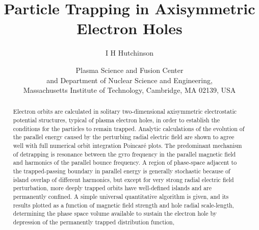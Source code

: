 \documentclass[draft,jgrga]{agutex}
\date{}
\def\maketitle{}
\def\dateskip{}
\def\affil#1{\date{#1}}
\def\dateskip{\medskip}
\begin{document}
\title{Particle Trapping in Axisymmetric Electron Holes}
\author{I H Hutchinson}
\affil{Plasma Science and Fusion Center\\ and
Department of Nuclear Science and Engineering,\\ \dateskip
Massachusetts Institute of Technology, Cambridge, MA 02139, USA}
\maketitle

\begin{abstract}
  Electron orbits are calculated in solitary two-dimensional
  axisymmetric electrostatic potential structures, typical of plasma
  electron holes, in order to establish the conditions for the
  particles to remain trapped.  Analytic calculations of the evolution
  of the parallel energy caused by the perturbing radial electric
  field are shown to agree well with full numerical orbit integration
  Poincar\'e plots. The predominant mechanism of detrapping is
  resonance between the gyro frequency in the parallel magnetic field
  and harmonics of the parallel bounce frequency. A region of
  phase-space adjacent to the trapped-passing boundary in parallel
  energy is generally stochastic because of island overlap of
  different harmonics, but except for very strong radial electric
  field perturbation, more deeply trapped orbits have well-defined
  islands and are permanently confined. A simple universal
  quantitative algorithm is given, and its results plotted as a
  function of magnetic field strength and hole radial scale-length,
  determining the phase space volume available to sustain the electron
  hole by depression of the permanently trapped distribution function,
\end{abstract}
\end{document}
